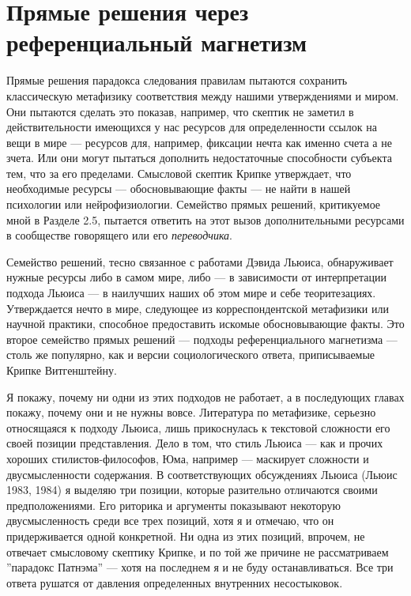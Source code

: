 \documentclass[11pt]{book}
\begin{document}
\qquad

\section{Прямые решения через референциальный магнетизм}

Прямые решения парадокса следования правилам пытаются сохранить классическую метафизику соответствия между нашими утверждениями и миром. Они пытаются сделать это показав, например, что скептик не заметил в действительности имеющихся у нас ресурсов для определенности ссылок на вещи в мире --- ресурсов для, например, фиксации нечта как именно счета а не зчета. Или они могут пытаться дополнить недостаточные способности субъекта тем, что за его пределами. Смысловой скептик Крипке утверждает, что необходимые ресурсы --- обосновывающие факты --- не найти в нашей психологии или нейрофизиологии. Семейство прямых решений, критикуемое мной в Разделе 2.5, пытается ответить на этот вызов дополнительными ресурсами в сообществе говорящего или его \textit{переводчика}.

Семейство решений, тесно связанное с работами Дэвида Льюиса, обнаруживает нужные ресурсы либо в самом мире, либо --- в зависимости от интерпретации подхода Льюиса --- в наилучших наших об этом мире и себе теоритезациях. Утверждается нечто в мире, следующее из корреспондентской метафизики или научной практики, способное предоставить искомые обосновывающие факты. Это второе семейство прямых решений --- подходы референциального магнетизма --- столь же популярно, как и версии социологического ответа, приписываемые Крипке Витгенштейну.

Я покажу, почему ни одни из этих подходов не работает, а в последующих главах покажу, почему они и не нужны вовсе. Литература по метафизике, серьезно относящаяся к подходу Льюиса, лишь прикоснулась к текстовой сложности его своей позиции представления. Дело в том, что стиль Льюиса --- как и прочих хороших стилистов-философов, Юма, например --- маскирует сложности и двусмысленности содержания. В соответствующих обсуждениях Льюиса (Льюис 1983, 1984) я выделяю три позиции, которые разительно отличаются своими предположениями. Его риторика и аргументы показывают некоторую двусмысленность среди все трех позиций, хотя я и отмечаю, что он придерживается одной конкретной. Ни одна из этих позиций, впрочем, не отвечает смысловому скептику Крипке, и по той же причине не рассматриваем ''парадокс Патнэма'' --- хотя на последнем я и не буду останавливаться. Все три ответа рушатся от давления определенных внутренних несостыковок.
\end{document}
